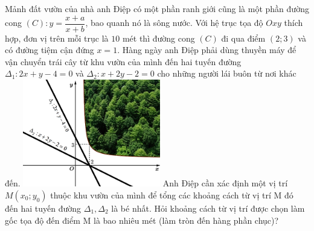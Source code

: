 \begin{ex}%
\immini
{
    Mảnh đất vườn của nhà anh Điệp có một phần ranh giới cũng là một phần đường cong $(C)\colon y=\dfrac{x+a}{x+b}$, bao quanh nó là sông nước. Với hệ trục tọa độ $Oxy$ thích hợp, đơn vị trên mỗi trục là $10$ mét thì đường cong $(C)$ đi qua điểm $\left(2;3\right)$ và có đường tiệm cận đứng $x=1$. Hàng ngày anh Điệp phải dùng thuyền máy để vận chuyển trái cây từ khu vườn của mình đến hai tuyến đường $\Delta_1\colon 2x+y-4=0$ và $\Delta_2\colon x+2y-2=0$ cho những người lái buôn từ nơi khác đến.
}
{
    \includegraphics[width=6cm]{img/HXN-1-19}
}
Anh Điệp cần xác định một vị trí $ M\left(x_0;y_0\right)$ thuộc khu vườn của mình để tổng các khoảng cách từ vị trí M đó đến hai tuyến đường $\Delta_1,\Delta_2$ là bé nhất. Hỏi khoảng cách từ vị trí được chọn làm gốc tọa độ đến điểm M là bao nhiêu mét (làm tròn đến hàng phần chục)?
\end{ex}
